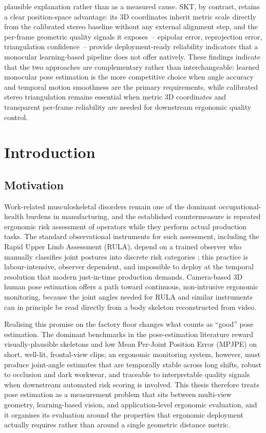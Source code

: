 \documentclass[12pt,a4paper]{article}
\begin{document}
plausible explanation rather than as a measured cause.
SKT, by contrast, retains a clear position-space advantage: its 3D coordinates
inherit metric scale directly from the calibrated stereo baseline without any
external alignment step, and the per-frame geometric quality signals it
exposes~-- epipolar error, reprojection error, triangulation confidence~--
provide deployment-ready reliability indicators that a monocular learning-based
pipeline does not offer natively.
These findings indicate that the two approaches are complementary rather than
interchangeable: learned monocular pose estimation is the more competitive
choice when angle accuracy and temporal motion smoothness are the primary
requirements, while calibrated stereo triangulation remains essential when
metric 3D coordinates and transparent per-frame reliability are needed for
downstream ergonomic quality control.

\newpage
\section{Introduction}

\subsection{Motivation}

Work-related musculoskeletal disorders remain one of the dominant
occupational-health burdens in manufacturing, and the established
countermeasure is repeated ergonomic risk assessment of operators while they
perform actual production tasks.
The standard observational instruments for such assessment, including the
Rapid Upper Limb Assessment (RULA), depend on a trained observer who manually
classifies joint postures into discrete risk categories
\cite{mcatamney1993rula}; this practice is labour-intensive, observer
dependent, and impossible to deploy at the temporal resolution that modern
just-in-time production demands.
Camera-based 3D human pose estimation offers a path toward continuous,
non-intrusive ergonomic monitoring, because the joint angles needed for RULA
and similar instruments can in principle be read directly from a body
skeleton reconstructed from video.

Realising this promise on the factory floor changes what counts as ``good''
pose estimation.
The dominant benchmarks in the pose-estimation literature reward
visually-plausible skeletons and low Mean Per-Joint Position Error (MPJPE) on
short, well-lit, frontal-view clips; an ergonomic monitoring system, however,
must produce joint-angle estimates that are temporally stable across long
shifts, robust to occlusion and dark workwear, and traceable to interpretable
quality signals when downstream automated risk scoring is involved.
This thesis therefore treats pose estimation as a measurement problem that
sits between multi-view geometry, learning-based vision, and application-level
ergonomic evaluation, and it organises its evaluation around the properties
that ergonomic deployment actually requires rather than around a single
geometric distance metric.
\end{document}
